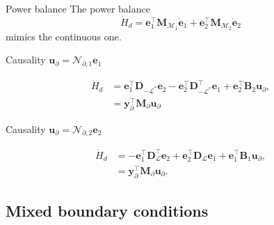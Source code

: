 \documentclass[aspectratio=169]{ISAE-Beamer}
\begin{document}
\begin{frame}{Power balance}
The power balance 
\begin{equation*}
\dot{H}_d = \mathbf{e}_1^\top \mathbf{M}_{\mathcal{M}_1} \dot{\mathbf{e}}_{1} + \mathbf{e}_2^\top \mathbf{M}_{\mathcal{M}_2} \dot{\mathbf{e}}_{2} 
\end{equation*}
mimics the continuous one.

\begin{exampleblock}{Causality $\bm{u}_\partial = \mathcal{N}_{\partial, 1} \displaystyle \bm{e}_1$}
	
	\begin{equation*}
	\begin{aligned}
	\dot{H}_d &= \mathbf{e}_{1}^\top \mathbf{D}_{-\mathcal{L}^*} \mathbf{e}_{2} - \mathbf{e}_{2}^\top \mathbf{D}_{-\mathcal{L}^*}^\top \mathbf{e}_{1} + \mathbf{e}_{2}^\top \mathbf{B}_2 \mathbf{u}_\partial, \\
	& = \mathbf{y}_\partial^\top \mathbf{M}_\partial \mathbf{u}_\partial
	\end{aligned}
	\end{equation*}
	
\end{exampleblock}

\begin{exampleblock}{Causality $\bm{u}_\partial = \mathcal{N}_{\partial, 2} \displaystyle \bm{e}_2$}
	
	\begin{equation*}
	\begin{aligned}
	\dot{H}_d 	&= - \mathbf{e}_{1}^\top \mathbf{D}_{\mathcal{L}}^\top \mathbf{e}_{2} + \mathbf{e}_{2}^\top \mathbf{D}_{\mathcal{L}} \mathbf{e}_{1} + \mathbf{e}_{1}^\top \mathbf{B}_1 \mathbf{u}_\partial, \\
	& = \mathbf{y}_\partial^\top \mathbf{M}_\partial \mathbf{u}_\partial.
	\end{aligned}
	\end{equation*}
	
\end{exampleblock}
\end{frame}


\subsection{Mixed boundary conditions}
\end{document}

